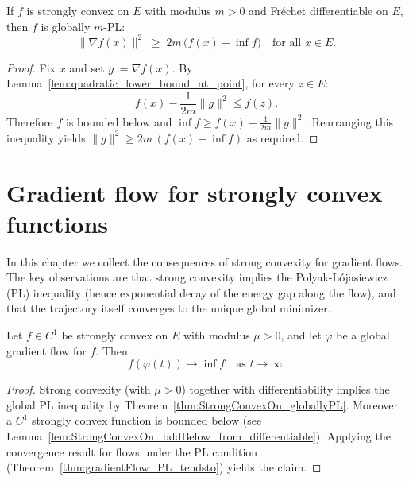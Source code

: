 \begin{theorem}\label{thm:StrongConvexOn_globallyPL}
  \leanok{}
  If $f$ is strongly convex on $E$ with modulus $m > 0$ and Fr\'echet
  differentiable on $E$, then $f$ is globally $m$-PL:
  \[
    \|\nabla f(x)\|^2 \;\ge\; 2m\,\bigl(f(x) - \inf f\bigr) \quad \text{for all } x \in E.
  \]
\end{theorem}

\begin{proof}
  \leanok{}
  Fix $x$ and set $g := \nabla f(x)$. By Lemma~\ref{lem:quadratic_lower_bound_at_point},
  for every $z \in E$:
  \[
    f(x) - \frac{1}{2m}\|g\|^2 \le f(z).
  \]
  Therefore $f$ is bounded below and $\inf f \ge f(x) - \frac{1}{2m}\|g\|^2$.
  Rearranging this inequality yields $\|g\|^2 \ge 2m\,(f(x) - \inf f)$ as required.
\end{proof}



\chapter{Gradient flow for strongly convex functions}\label{sec:GF_StronglyConvex}

In this chapter we collect the consequences of strong convexity for gradient
flows. The key observations are that strong convexity implies the Polyak-L\'ojasiewicz
(PL) inequality (hence exponential decay of the energy gap along the flow), and that
the trajectory itself converges to the unique global minimizer.

\begin{theorem}\label{thm:gradientFlow_strongConvex_tendsto}
  \leanok{}
  Let $f\in C^1$ be strongly convex on $E$ with modulus $\mu>0$, and let $\varphi$ be
  a global gradient flow for $f$. Then
  \[
    f(\varphi(t)) \to \inf f \quad\text{as } t\to\infty.
  \]
\end{theorem}
\begin{proof}
  \leanok{}
  Strong convexity (with $\mu>0$) together with differentiability implies the
  global PL inequality by Theorem~\ref{thm:StrongConvexOn_globallyPL}.
  Moreover a $C^1$ strongly convex function is bounded below (see
  Lemma~\ref{lem:StrongConvexOn_bddBelow_from_differentiable}). Applying the convergence result
  for flows under the PL condition (Theorem~\ref{thm:gradientFlow_PL_tendsto})
  yields the claim.
\end{proof}

